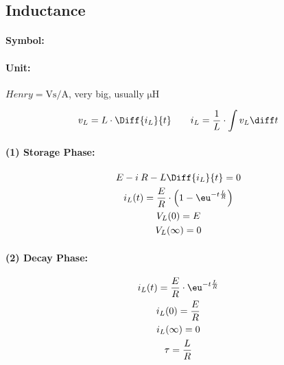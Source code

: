 
\subsection{Inductance} %
	
	\paragraph{Symbol:} %
	\paragraph{Unit:} %
		$\si{Henry} = \si{\volt\second\per\ampere}$, very big, usually $\si{\micro\henry}$
	
	\begin{gather*}
		v_L = L \cdot \Diff{i_L}{t} \qquad i_L = \frac{1}{L} \cdot \int v_L \diff t
	\end{gather*}
	\begin{center}
	\end{center}
	\begin{multicols*}{2}
		\paragraph{(1) Storage Phase:} %
		
			\begin{gather*}
				E - i\:R - L \Diff{i_L}{t} = 0 \\
				i_L(t) = \frac{E}{R} \cdot \left(
					1 - \eu^{-t\frac{L}{R}}
				\right) \\
				V_L(0) = E \\ V_L(\infty) = 0
			\end{gather*}
		
		\paragraph{(2) Decay Phase:} %
		
			\begin{gather*}
				i_L (t) = \frac{E}{R} \cdot \eu^{-t\frac{L}{R}} \\
				i_L(0) = \frac{E}{R} \\
				i_L(\infty) = 0 \\
				\tau = \frac{L}{R}
			\end{gather*}
	\end{multicols*}
	
